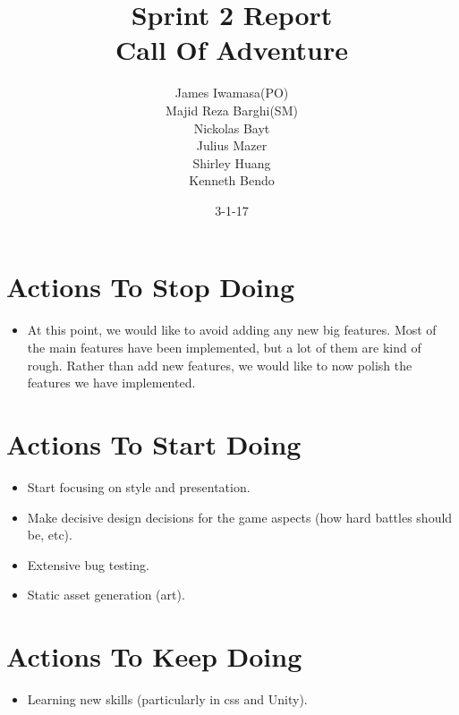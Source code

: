\documentclass[12pt]{report}
\begin{document}
\title{Sprint 2 Report\\Call Of Adventure}
\author{James Iwamasa(PO)\\Majid Reza Barghi(SM)\\Nickolas Bayt\\Julius Mazer\\Shirley Huang\\Kenneth Bendo}
\date{3-1-17}
\maketitle


\newpage
\section{Actions To Stop Doing}
\begin{itemize}
	\item At this point, we would like to avoid adding any new big features. Most of the main features have been 
implemented, but a lot of them are kind of rough. Rather than add new features, we would like to now polish 
the features we have implemented. 
\end{itemize}

\section{Actions To Start Doing}
\begin{itemize}
	\item Start focusing on style and presentation. 
	\item Make decisive design decisions for the game aspects (how hard battles should be, etc).
	\item Extensive bug testing.
	\item Static asset generation (art).
\end{itemize}

\section{Actions To Keep Doing}
\begin{itemize}
	\item Learning new skills (particularly in css and Unity).
\end{itemize}
\end{document}
